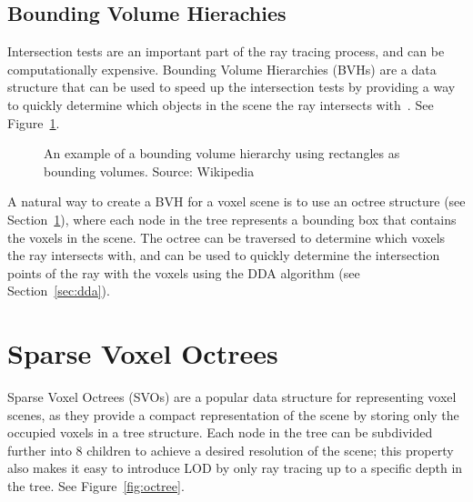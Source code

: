 \subsection{Bounding Volume Hierachies} \label{sec:bvh}
Intersection tests are an important part of the ray tracing process, and can be computationally expensive. Bounding Volume
Hierarchies (BVHs) are a data structure that can be used to speed up the intersection tests by providing a way to quickly
determine which objects in the scene the ray intersects with~\cite{Ize_2009}. See Figure~\ref{fig:bvh}.

\begin{figure}[thp]
    \begin{center}
    \end{center}
    \caption{An example of a bounding volume hierarchy using rectangles as bounding volumes. Source: Wikipedia}
    \label{fig:bvh}
\end{figure}

A natural way to create a BVH for a voxel scene is to use an octree structure (see Section~\ref{sec:svo}), where each node
in the tree represents a bounding box that contains the voxels in the scene. The octree can be traversed to determine which
voxels the ray intersects with, and can be used to quickly determine the intersection points of the ray with the voxels
using the DDA algorithm (see Section~\ref{sec:dda}).

\section{Sparse Voxel Octrees} \label{sec:svo}
Sparse Voxel Octrees (SVOs) are a popular data structure for representing voxel scenes, as they provide a compact representation
of the scene by storing only the occupied voxels in a tree structure. Each node in the tree can be subdivided further into
8 children to achieve a desired resolution of the scene; this property also makes it easy to introduce LOD by only ray tracing
up to a specific depth in the tree. See Figure~\ref{fig:octree}.

